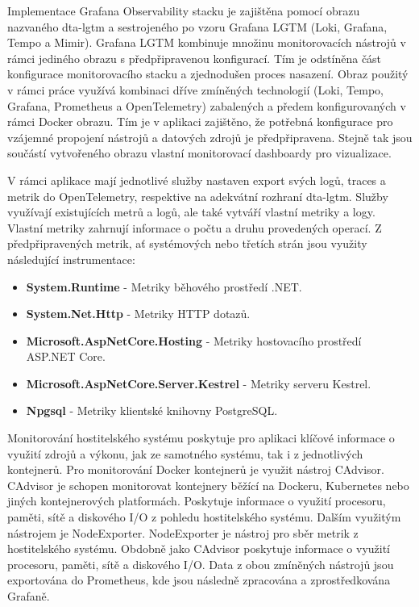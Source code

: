Implementace Grafana Observability stacku je zajištěna pomocí obrazu nazvaného dta-lgtm a sestrojeného po vzoru Grafana LGTM (Loki, Grafana, Tempo a Mimir). Grafana LGTM kombinuje množinu monitorovacích nástrojů v rámci jediného obrazu s předpřipravenou konfigurací. Tím je odstíněna část konfigurace monitorovacího stacku a zjednodušen proces nasazení. Obraz použitý v rámci práce využívá kombinaci dříve zmíněných technologií (Loki, Tempo, Grafana, Prometheus a OpenTelemetry) zabalených a předem konfigurovaných v rámci Docker obrazu. Tím je v aplikaci zajištěno, že potřebná konfigurace pro vzájemné propojení nástrojů a datových zdrojů je předpřipravena. Stejně tak jsou součástí vytvořeného obrazu vlastní monitorovací dashboardy pro vizualizace.

V rámci aplikace mají jednotlivé služby nastaven export svých logů, traces a metrik do OpenTelemetry, respektive na adekvátní rozhraní dta-lgtm. Služby využívají existujících metrů a logů, ale také vytváří vlastní metriky a logy. Vlastní metriky zahrnují informace o počtu a druhu provedených operací. Z předpřipravených metrik, ať systémových nebo třetích strán jsou využity následující instrumentace:

\begin{itemize}
  \item \textbf{System.Runtime} - Metriky běhového prostředí .NET.
  \item \textbf{System.Net.Http} - Metriky HTTP dotazů.
  \item \textbf{Microsoft.AspNetCore.Hosting} - Metriky hostovacího prostředí ASP.NET Core.
  \item \textbf{Microsoft.AspNetCore.Server.Kestrel} - Metriky serveru Kestrel.
  \item \textbf{Npgsql} - Metriky klientské knihovny PostgreSQL.
\end{itemize}


Monitorování hostitelského systému poskytuje pro aplikaci klíčové informace o využití zdrojů a výkonu, jak ze samotného systému, tak i z jednotlivých kontejnerů. Pro monitorování Docker kontejnerů je využit nástroj CAdvisor. CAdvisor je schopen monitorovat kontejnery běžící na Dockeru, Kubernetes nebo jiných kontejnerových platformách. Poskytuje informace o využití procesoru, paměti, sítě a diskového I/O z pohledu hostitelského systému. Dalším využitým nástrojem je NodeExporter. NodeExporter je nástroj pro sběr metrik z hostitelského systému. Obdobně jako CAdvisor poskytuje informace o využití procesoru, paměti, sítě a diskového I/O. Data z obou zmíněných nástrojů jsou exportována do Prometheus, kde jsou následně zpracována a zprostředkována Grafaně.

